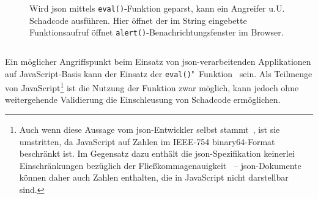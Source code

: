 \begin{figure}[h]
\begin{example} Wird \acrshort{json} mittels \texttt{eval()}-Funktion geparst, kann ein Angreifer u.U. Schadcode ausführen. Hier öffnet der im String eingebette Funktionsaufruf öffnet \texttt{alert()}-Benachrichtungsfenster im Browser.
\inputminted{javascript}{json-eval.js}
\begin{center}
\end{center}
\end{example}
\end{figure}

Ein möglicher Angriffspunkt beim Einsatz von \acrshort{json}-verarbeitenden Applikationen auf JavaScript-Basis kann der Einsatz der \texttt{eval()}"~Funktion~\cite[Abschnitt 18.2.1]{ecma262} sein. Als Teilmenge von JavaScript\footnote{Auch wenn diese Aussage vom \acrshort{json}-Entwickler selbst stammt~\cite{crockford2006fatfree}, ist sie umstritten, da JavaScript auf Zahlen im IEEE-754 binary64-Format~\cite[Abschnitt 6.1.6]{ecma262} beschränkt ist. Im Gegensatz dazu enthält die \acrshort{json}-Spezifikation keinerlei Einschränkungen bezüglich der Fließkommagenauigkeit~\cite[Abschnitt 8]{ecma404} -- \acrshort{json}-Dokumente können daher auch Zahlen enthalten, die in JavaScript nicht darstellbar sind.} ist die Nutzung der Funktion zwar möglich, kann jedoch ohne weitergehende Validierung die Einschleusung von Schadcode ermöglichen.
